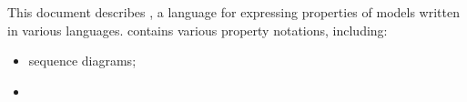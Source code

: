 This document describes \langname, a language for expressing
properties of models written in various \robostar{} languages.
\langname{} contains various property notations, including:

\begin{itemize}
\item
  sequence diagrams;
\item
\end{itemize}

